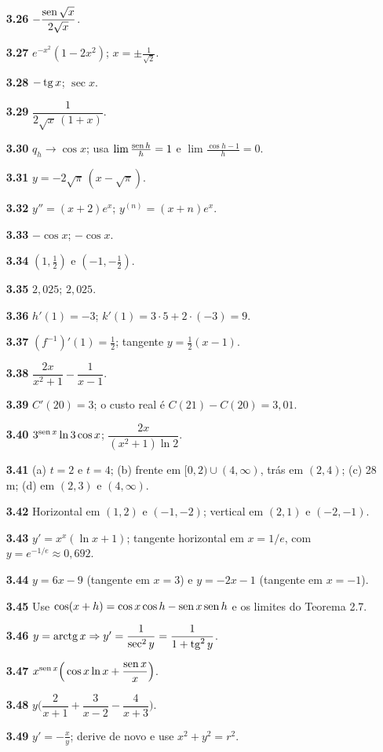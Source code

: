 {\begin{multicols}{2}
\begin{itemize}[leftmargin=2.7em,labelsep=0.5em,itemsep=1pt]
\item[\textbf{3.26}] $-\dfrac{\operatorname{sen}\sqrt x}{2\sqrt x}$.
\item[\textbf{3.27}] $e^{-x^2}(1-2x^2)$; $x=\pm\tfrac1{\sqrt2}$.
\item[\textbf{3.28}] $-\operatorname{tg} x$; $\sec x$.
\item[\textbf{3.29}] $\dfrac1{2\sqrt x\,(1+x)}$.
\item[\textbf{3.30}] $q_h\to\cos x$; usa $\lim\frac{\operatorname{sen} h}h=1$ e $\lim\frac{\cos h-1}h=0$.
\item[\textbf{3.31}] $y=-2\sqrt\pi\,(x-\sqrt\pi)$.
\item[\textbf{3.32}] $y''=(x+2)e^x$; $y^{(n)}=(x+n)e^x$.
\item[\textbf{3.33}] $-\cos x$; $-\cos x$.
\item[\textbf{3.34}] $(1,\tfrac12)$ e $(-1,-\tfrac12)$.
\item[\textbf{3.35}] $2{,}025$; $2{,}025$.
\item[\textbf{3.36}] $h'(1)=-3$; $k'(1)=3\cdot5+2\cdot(-3)=9$.
\item[\textbf{3.37}] $(f^{-1})'(1)=\tfrac12$; tangente $y=\tfrac12(x-1)$.
\item[\textbf{3.38}] $\dfrac{2x}{x^2+1}-\dfrac1{x-1}$.
\item[\textbf{3.39}] $C'(20)=3$; o custo real é $C(21)-C(20)=3{,}01$.
\item[\textbf{3.40}] $3^{\operatorname{sen} x}\ln3\cos x$; $\dfrac{2x}{(x^2+1)\ln2}$.
\item[\textbf{3.41}] (a) $t=2$ e $t=4$; (b) frente em $[0,2)\cup(4,\infty)$, trás em $(2,4)$; (c) 28 m; (d) em $(2,3)$ e $(4,\infty)$.
\item[\textbf{3.42}] Horizontal em $(1,2)$ e $(-1,-2)$; vertical em $(2,1)$ e $(-2,-1)$.
\item[\textbf{3.43}] $y'=x^x(\ln x+1)$; tangente horizontal em $x=1/e$, com $y=e^{-1/e}\approx0{,}692$.
\item[\textbf{3.44}] $y=6x-9$ (tangente em $x=3$) e $y=-2x-1$ (tangente em $x=-1$).
\item[\textbf{3.45}] Use $\cos(x+h)=\cos x\cos h-\operatorname{sen} x\operatorname{sen} h$ e os limites do Teorema 2.7.
\item[\textbf{3.46}] $y=\operatorname{arctg} x\Rightarrow y'=\dfrac1{\sec^2y}=\dfrac1{1+\operatorname{tg}^2y}$.
\item[\textbf{3.47}] $x^{\operatorname{sen} x}\Big(\cos x\ln x+\dfrac{\operatorname{sen} x}x\Big)$.
\item[\textbf{3.48}] $y\Big(\dfrac2{x+1}+\dfrac3{x-2}-\dfrac4{x+3}\Big)$.
\item[\textbf{3.49}] $y'=-\tfrac xy$; derive de novo e use $x^2+y^2=r^2$.

\end{itemize}
\end{multicols}}
